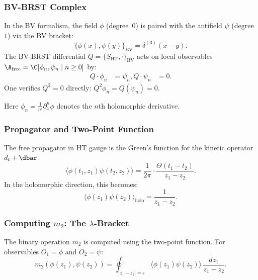 \subsubsection{BV-BRST Complex}

In the BV formalism, the field $\phi$ (degree~$0$) is paired with the antifield $\psi$ (degree~$1$) via the BV bracket:
\begin{equation}
\{\phi(x), \psi(y)\}_{\mathrm{BV}} = \delta^{(3)}(x-y).
\end{equation}
The BV-BRST differential $Q = \{S_{\text{HT}}, \cdot\}_{\mathrm{BV}}$ acts on local observables $\A_{\text{free}} = \C[\phi_n, \psi_n \mid n \geq 0]$ by:
\begin{align}
Q \cdot \phi_n &= \psi_n, %
Q \cdot \psi_n &= 0. %
\end{align}
One verifies $Q^2 = 0$ directly: $Q^2\phi_n = Q(\psi_n) = 0$.

Here $\phi_n = \frac{1}{n!} \partial_z^n \phi$ denotes the $n$th holomorphic derivative.
\subsubsection{Propagator and Two-Point Function}
The free propagator in HT gauge is the Green's function for the kinetic operator $d_t + \dbar$:
\begin{equation}
\langle \phi(t_1, z_1) \psi(t_2, z_2) \rangle = \frac{1}{2\pi} \cdot \frac{\Theta(t_1 - t_2)}{z_1 - z_2}.
\end{equation}
In the holomorphic direction, this becomes:
\begin{equation}
\langle \phi(z_1) \psi(z_2) \rangle_{\text{holo}} = \frac{1}{z_1 - z_2}.
\end{equation}

\subsubsection{Computing $m_2$: The $\lambda$-Bracket}
The binary operation $m_2$ is computed using the two-point function. For observables $O_1 = \phi$ and $O_2 = \psi$:
\begin{equation}
m_2(\phi(z_1), \psi(z_2)) = \oint_{|z_1 - z_2| = \varepsilon} \langle \phi(z_1) \psi(z_2) \rangle \, \frac{dz_1}{z_1 - z_2}.
\end{equation}


